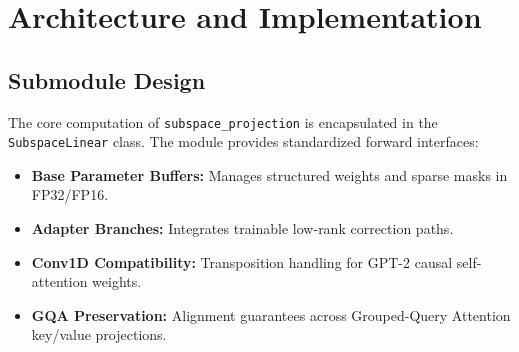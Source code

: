 \section{Architecture and Implementation}

\subsection{Submodule Design}
The core computation of \texttt{subspace_projection} is encapsulated in the \texttt{SubspaceLinear} class. The module provides standardized forward interfaces:
\begin{itemize}
\item \textbf{Base Parameter Buffers:} Manages structured weights and sparse masks in FP32/FP16.
\item \textbf{Adapter Branches:} Integrates trainable low-rank correction paths.
\item \textbf{Conv1D Compatibility:} Transposition handling for GPT-2 causal self-attention weights.
\item \textbf{GQA Preservation:} Alignment guarantees across Grouped-Query Attention key/value projections.
\end{itemize}
